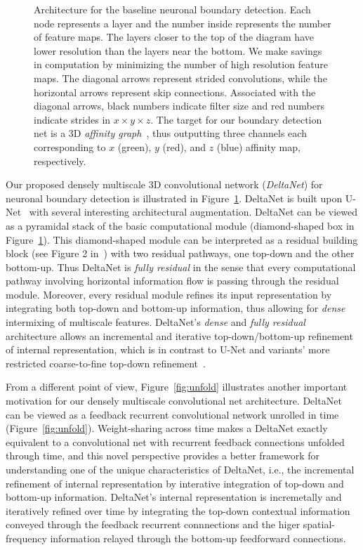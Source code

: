 \documentclass{article}
\begin{document}
\begin{appendices}
\begin{figure}[!b]
\caption{Architecture for the baseline neuronal boundary detection. Each node
represents a layer and the number inside represents the number of feature maps.
The layers closer to the top of the diagram have lower resolution than the
layers near the bottom. We make savings in computation by minimizing the number
of high resolution feature maps. The diagonal arrows represent strided
convolutions, while the horizontal arrows represent skip connections. Associated
with the diagonal arrows, black numbers indicate filter size and red numbers
indicate strides in $x\times y\times z$. The target for our boundary detection
net is a 3D \emph{affinity graph}~\cite{boundary_detection,kisuk,funke2017deep},
thus outputting three channels each corresponding to $x$ (green), $y$ (red), and
$z$ (blue) affinity map, respectively.}

\label{fig:boundary_detector}
\end{figure}

Our proposed densely multiscale 3D convolutional network (\emph{DeltaNet}) for
neuronal boundary detection is illustrated in
Figure~\ref{fig:boundary_detector}. DeltaNet is built upon U-Net~\cite{unet}
with several interesting architectural augmentation. DeltaNet can be viewed as a
pyramidal stack of the basic computational module (diamond-shaped box in
Figure~\ref{fig:boundary_detector}). This diamond-shaped module can be
interpreted as a residual building block (see Figure 2 in~\cite{resnet}) with
two residual pathways, one top-down and the other bottom-up. Thus DeltaNet is
\emph{fully residual} in the sense that every computational pathway involving
horizontal information flow is passing through the residual module. Moreover,
every residual module refines its input representation by integrating both
top-down and bottom-up information, thus allowing for \emph{dense} intermixing
of multiscale features. DeltaNet's \emph{dense} and \emph{fully residual}
architecture allows an incremental and iterative top-down/bottom-up refinement
of internal representation, which is in contrast to U-Net and variants' more
restricted coarse-to-fine top-down
refinement~\cite{pinheiro2016refine,lin2016pyramid}.

From a different point of view, Figure~\ref{fig:unfold} illustrates another
important motivation for our densely multiscale convolutional net architecture.
DeltaNet can be viewed as a feedback recurrent convolutional network unrolled in
time (Figure~\ref{fig:unfold}). Weight-sharing across time makes a DeltaNet
exactly equivalent to a convolutional net with recurrent feedback connections
unfolded through time, and this novel perspective provides a better framework
for understanding one of the unique characteristics of DeltaNet, i.e., the
incremental refinement of internal representation by interative integration of
top-down and bottom-up information. DeltaNet's internal representation is
incremetally and iteratively refined over time by integrating the top-down
contextual information conveyed through the feedback recurrent connnections and
the higer spatial-frequency information relayed through the bottom-up
feedforward connections.


\end{appendices}
\end{document}
